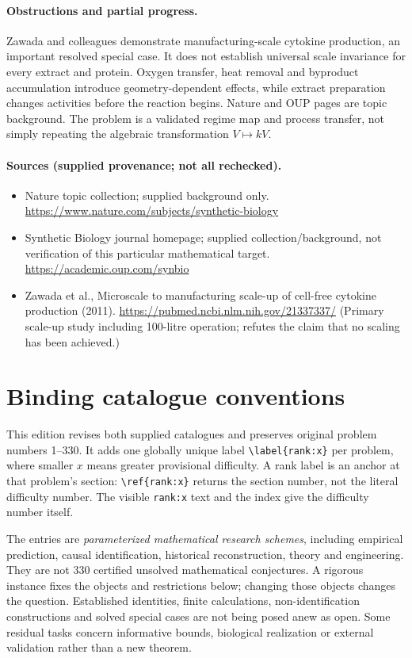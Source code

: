 \documentclass[11pt]{article}
\begin{document}
\paragraph{Obstructions and partial progress.} Zawada and colleagues demonstrate manufacturing-scale cytokine production, an important resolved special case. It does not establish universal scale invariance for every extract and protein. Oxygen transfer, heat removal and byproduct accumulation introduce geometry-dependent effects, while extract preparation changes activities before the reaction begins. Nature and OUP pages are topic background. The problem is a validated regime map and process transfer, not simply repeating the algebraic transformation $V\mapsto kV$.

\paragraph{Sources (supplied provenance; not all rechecked).} \begin{itemize}
\item Nature topic collection; supplied background only. \url{https://www.nature.com/subjects/synthetic-biology}
\item Synthetic Biology journal homepage; supplied collection/background, not verification of this particular mathematical target. \url{https://academic.oup.com/synbio}
\item Zawada et al., Microscale to manufacturing scale-up of cell-free cytokine production (2011). \url{https://pubmed.ncbi.nlm.nih.gov/21337337/} (Primary scale-up study including 100-litre operation; refutes the claim that no scaling has been achieved.)
\end{itemize}


\section*{Binding catalogue conventions}
This edition revises both supplied catalogues and preserves original problem numbers 1--330. It adds one globally unique label \verb|\label{rank:x}| per problem, where smaller $x$ means greater provisional difficulty. A rank label is an anchor at that problem's section: \verb|\ref{rank:x}| returns the section number, not the literal difficulty number. The visible \texttt{rank:x} text and the index give the difficulty number itself.

The entries are \emph{parameterized mathematical research schemes}, including empirical prediction, causal identification, historical reconstruction, theory and engineering. They are not 330 certified unsolved mathematical conjectures. A rigorous instance fixes the objects and restrictions below; changing those objects changes the question. Established identities, finite calculations, non-identification constructions and solved special cases are not being posed anew as open. Some residual tasks concern informative bounds, biological realization or external validation rather than a new theorem.
\end{document}
